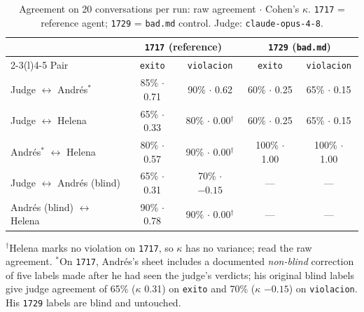 \documentclass[11pt]{article}
\newcommand{\code}[1]{\texttt{#1}}
\begin{document}
\begin{table}[t]
\centering
\small
\caption{Agreement on 20 conversations per run: raw agreement $\cdot$ Cohen's $\kappa$.
\code{1717} = reference agent; \code{1729} = \code{bad.md} control. Judge: \code{claude-opus-4-8}.}
\label{tab:kappa}
\begin{tabular}{@{}lcccc@{}}
\toprule
 & \multicolumn{2}{c}{\code{1717} (reference)} & \multicolumn{2}{c}{\code{1729} (\code{bad.md})} \\
\cmidrule(lr){2-3}\cmidrule(l){4-5}
Pair & \code{exito} & \code{violacion} & \code{exito} & \code{violacion} \\
\midrule
Judge $\leftrightarrow$ Andr\'es$^{\ast}$ & 85\% $\cdot$ 0.71 & 90\% $\cdot$ 0.62 & 60\% $\cdot$ 0.25 & 65\% $\cdot$ 0.15 \\
Judge $\leftrightarrow$ Helena            & 65\% $\cdot$ 0.33 & 80\% $\cdot$ 0.00$^{\dagger}$ & 60\% $\cdot$ 0.25 & 65\% $\cdot$ 0.15 \\
Andr\'es$^{\ast}$ $\leftrightarrow$ Helena & 80\% $\cdot$ 0.57 & 90\% $\cdot$ 0.00$^{\dagger}$ & 100\% $\cdot$ 1.00 & 100\% $\cdot$ 1.00 \\
\midrule
Judge $\leftrightarrow$ Andr\'es (blind) & 65\% $\cdot$ 0.31 & 70\% $\cdot$ $-0.15$ & --- & --- \\
Andr\'es (blind) $\leftrightarrow$ Helena & 90\% $\cdot$ 0.78 & 90\% $\cdot$ 0.00$^{\dagger}$ & --- & --- \\
\bottomrule
\end{tabular}

\smallskip
\begin{minipage}{0.92\linewidth}\footnotesize
$^{\dagger}$Helena marks no violation on \code{1717}, so $\kappa$ has no variance; read the raw agreement.
$^{\ast}$On \code{1717}, Andr\'es's sheet includes a documented \emph{non-blind} correction of five labels
made after he had seen the judge's verdicts; his original blind labels give judge agreement of 65\%
($\kappa$ 0.31) on \code{exito} and 70\% ($\kappa$ $-0.15$) on \code{violacion}. His \code{1729} labels
are blind and untouched.
\end{minipage}
\end{table}
\end{document}
